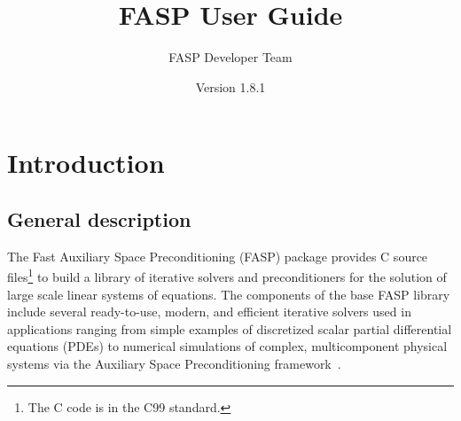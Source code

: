 \documentclass[11pt]{memoir}
\title{\Huge FASP User Guide}
\author{FASP Developer Team}
\date{\vfill Version 1.8.1} %
\begin{document}
\clearpage\maketitle
\thispagestyle{empty}

\newpage
\setcounter{page}{1}
\tableofcontents

\chapter{Introduction}\label{ch:intro}




\section{General description}
The Fast Auxiliary Space Preconditioning (FASP) package provides
C source files\footnote{The C code is in the C99 standard.} to build a library of
iterative solvers and preconditioners for the solution of large scale
linear systems of equations.  The components of the base FASP library
include several ready-to-use, modern, and efficient iterative solvers
used in applications ranging from simple examples of discretized
scalar partial differential equations (PDEs) to numerical simulations
of complex, multicomponent physical systems via the Auxiliary Space
Preconditioning framework~\cite{Xu.Xu.2010ff}.
\end{document}
